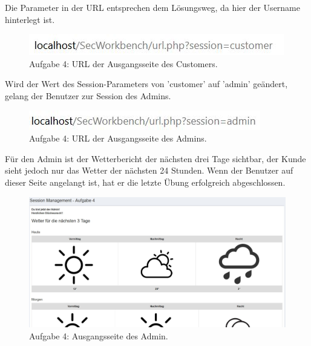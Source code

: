 Die Parameter in der URL entsprechen dem Lösungsweg, da hier der Username hinterlegt ist.
\begin{figure}[H]
	\includegraphics[width=1.0\linewidth]{images/BrokenAuthenticationAndSessionManagement/URL_customer_url}
	\caption[Aufgabe 4: URL der Ausgangsseite des Customers.]{Aufgabe 4: URL der Ausgangsseite des Customers.}
	\label{fig:Aufgabe 4 URL der Ausgangsseite des Customers}
\end{figure} 
\noindent Wird der Wert des Session-Parameters von 'customer' auf 'admin' geändert, gelang der Benutzer zur Session des Admins.
\begin{figure}[H]
	\includegraphics[width=1.0\linewidth]{images/BrokenAuthenticationAndSessionManagement/URL_admin_url}
	\caption[Aufgabe 4: URL der Ausgangsseite des Admins.]{Aufgabe 4: URL der Ausgangsseite des Admins.}
	\label{fig:Aufgabe 4 URL der Ausgangsseite des Admins}
\end{figure}
\noindent Für den Admin ist der Wetterbericht der nächsten drei Tage sichtbar, der Kunde sieht jedoch nur das Wetter der nächsten 24 Stunden. Wenn der Benutzer auf dieser Seite angelangt ist, hat er die letzte Übung erfolgreich abgeschlossen.
\begin{figure}[H]
	\includegraphics[width=1.0\linewidth]{images/BrokenAuthenticationAndSessionManagement/URL_admin}
	\caption[Aufgabe 4: Ausgangsseite des Admin.]{Aufgabe 4: Ausgangsseite des Admin.}
	\label{fig:Aufgabe 4 Ausgangsseite des Admin}
\end{figure}